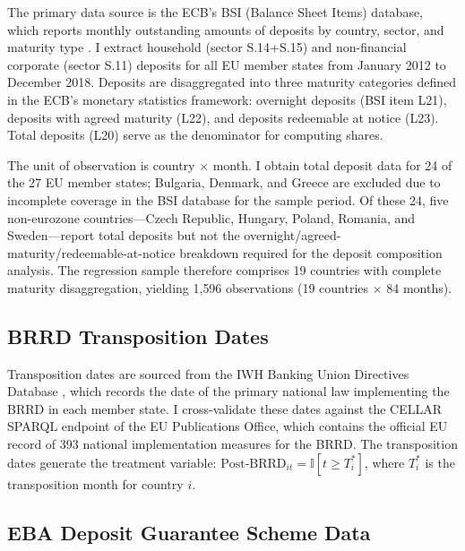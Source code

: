 \documentclass[12pt]{article}
\newcommand{\ind}{\mathbb{I}}
\begin{document}
The primary data source is the ECB's BSI (Balance Sheet Items) database, which reports monthly outstanding amounts of deposits by country, sector, and maturity type \citep{ecb2016bsi}. I extract household (sector S.14+S.15) and non-financial corporate (sector S.11) deposits for all EU member states from January 2012 to December 2018. Deposits are disaggregated into three maturity categories defined in the ECB's monetary statistics framework: overnight deposits (BSI item L21), deposits with agreed maturity (L22), and deposits redeemable at notice (L23). Total deposits (L20) serve as the denominator for computing shares.

The unit of observation is country $\times$ month. I obtain total deposit data for 24 of the 27 EU member states; Bulgaria, Denmark, and Greece are excluded due to incomplete coverage in the BSI database for the sample period. Of these 24, five non-eurozone countries---Czech Republic, Hungary, Poland, Romania, and Sweden---report total deposits but not the overnight/agreed-maturity/redeemable-at-notice breakdown required for the deposit composition analysis. The regression sample therefore comprises 19 countries with complete maturity disaggregation, yielding 1{,}596 observations (19 countries $\times$ 84 months).

\subsection{BRRD Transposition Dates}

Transposition dates are sourced from the IWH Banking Union Directives Database \citep{deroth2022iwh}, which records the date of the primary national law implementing the BRRD in each member state. I cross-validate these dates against the CELLAR SPARQL endpoint of the EU Publications Office, which contains the official EU record of 393 national implementation measures for the BRRD. The transposition dates generate the treatment variable: $\text{Post-BRRD}_{it} = \ind[t \geq T_i^*]$, where $T_i^*$ is the transposition month for country $i$.

\subsection{EBA Deposit Guarantee Scheme Data}
\end{document}
